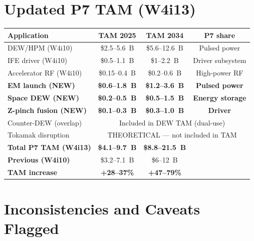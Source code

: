 \documentclass[11pt]{article}
\begin{document}
\section{Updated P7 TAM (W4i13)}

\begin{center}
\begin{tabular}{lccc}
\toprule
Application & TAM 2025 & TAM 2034 & P7 share \\
\midrule
DEW/HPM (W4i10) & \$2.5--5.6~B & \$5.6--12.6~B & Pulsed power \\
IFE driver (W4i10) & \$0.5--1.1~B & \$1--2.2~B & Driver subsystem \\
Accelerator RF (W4i10) & \$0.15--0.4~B & \$0.2--0.6~B & High-power RF \\
\textbf{EM launch (NEW)} & \textbf{\$0.6--1.8~B} & \textbf{\$1.2--3.6~B} & \textbf{Pulsed power} \\
\textbf{Space DEW (NEW)} & \textbf{\$0.2--0.5~B} & \textbf{\$0.5--1.5~B} & \textbf{Energy storage} \\
\textbf{Z-pinch fusion (NEW)} & \textbf{\$0.1--0.3~B} & \textbf{\$0.3--1.0~B} & \textbf{Driver} \\
Counter-DEW (overlap) & \multicolumn{3}{c}{Included in DEW TAM (dual-use)} \\
Tokamak disruption & \multicolumn{3}{c}{THEORETICAL --- not included in TAM} \\
\midrule
\textbf{Total P7 TAM (W4i13)} & \textbf{\$4.1--9.7~B} & \textbf{\$8.8--21.5~B} & \\
\textbf{Previous (W4i10)} & \$3.2--7.1~B & \$6--12~B & \\
\textbf{TAM increase} & \textbf{+28--37\%} & \textbf{+47--79\%} & \\
\bottomrule
\end{tabular}
\end{center}

\section{Inconsistencies and Caveats Flagged}
\end{document}
